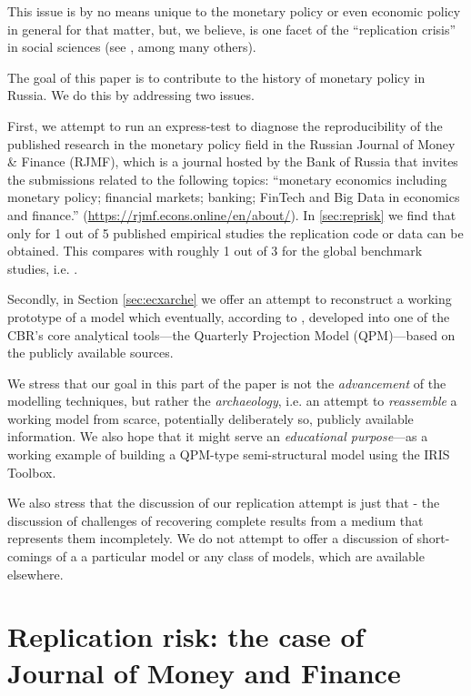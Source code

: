 \documentclass[12pt]{article}
\begin{document}
This issue is by no means unique to the monetary policy or even economic policy in general for that matter, but, we believe, is one facet of the ``replication crisis'' in social sciences (see \cite{ozier2019}, among many others). 

The goal of this paper is to contribute to the history of monetary policy in Russia. We do this by addressing two issues. 

First, we attempt to run an express-test to diagnose the reproducibility of the published research in the monetary policy field in the Russian Journal of Money \& Finance (RJMF), which is a journal hosted by the Bank of Russia that invites the submissions related to the following topics: ``monetary economics including monetary policy; financial markets; banking; FinTech and Big Data in economics and finance.'' (\href{https://rjmf.econs.online/en/about/}{https://rjmf.econs.online/en/about/}). In \autoref{sec:reprisk} we find that only for 1 out of 5 published empirical studies the replication code or data can be obtained. This compares with roughly 1 out of 3 for the global benchmark studies, i.e. \cite{gertler2018make}.

Secondly, in  Section \ref{sec:ecxarche} we offer an attempt to reconstruct a working prototype of a model which eventually, according to \cite{bankofrussiampr201501}, developed into one of the CBR's core analytical tools---the Quarterly Projection Model (QPM)---based on the publicly available sources.

We stress that our goal in this part of the paper is not the {\it advancement} of the modelling techniques, but rather the {\it archaeology}, i.e. an attempt to {\it reassemble} a working model from scarce, potentially deliberately so, publicly available information. We also hope that it might serve an {\it educational purpose}---as a working example of building a QPM-type semi-structural model using the IRIS Toolbox. 

We also stress that the discussion of our replication attempt is just that - the discussion of challenges of recovering complete results from a medium that represents them incompletely. We do not attempt to offer a discussion of short-comings of a a particular model or any class of models, which are available elsewhere.


\section{Replication risk: the case of Journal of Money and Finance}
\label{sec:reprisk}
\end{document}
